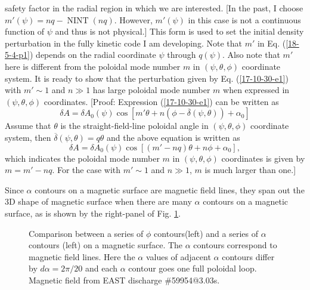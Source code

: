 \documentclass{llncs}
\newcommand{\tmop}[1]{\ensuremath{\operatorname{#1}}}
\begin{document}
safety factor in the radial region in which we are interested. [In the past, I
choose $m' (\psi) = n q - \tmop{NINT} (n q)$. However, $m' (\psi)$ in this
case is not a continuous function of $\psi$ and thus is not physical.] This
form is used to set the initial density perturbation in the fully kinetic code
I am developing. Note that $m'$ in Eq. (\ref{18-5-4-p1}) depends on the radial
coordinate $\psi$ through $q (\psi)$. Also note that $m'$ here is different
from the poloidal mode number $m$ in $(\psi, \theta, \phi)$ coordinate system.
It is ready to show that the perturbation given by Eq. (\ref{17-10-30-e1})
with $m' \sim 1$ and $n \gg 1$ has large poloidal mode number $m$ when
expressed in $(\psi, \theta, \phi)$ coordinates. [Proof: Expression
(\ref{17-10-30-e1}) can be written as
\begin{equation}
  \delta A = \delta A_0 (\psi) \cos [m' \theta + n (\phi - \overline{\delta}
  (\psi, \theta)) + \alpha_0]
\end{equation}
Assume that $\theta$ is the straight-field-line poloidal angle in $(\psi,
\theta, \phi)$ coordinate system, then $\overline{\delta} (\psi, \theta) = q
\theta$ and the above equation is written as
\begin{equation}
  \delta A = \delta A_0 (\psi) \cos [(m' - n q) \theta + n \phi + \alpha_0],
\end{equation}
which indicates the poloidal mode number $m$ in $(\psi, \theta, \phi)$
coordinates is given by $m = m' - n q$. For the case with $m' \sim 1$ and $n
\gg 1$, $m$ is much larger than one.]

Since $\alpha$ contours on a magnetic surface are magnetic field lines, they
span out the 3D shape of magnetic surface when there are many $\alpha$
contours on a magnetic surface, as is shown by the right-panel of Fig.
\ref{17-10-29-e1}.

\begin{figure}[h]
  \caption{\label{17-10-29-e1}Comparison between a series of $\phi$
  contours(left) and a series of $\alpha$ contours (left) on a magnetic
  surface. The $\alpha$ contours correspond to magnetic field lines. Here the
  $\alpha$ values of adjacent $\alpha$ contours differ by $d \alpha = 2 \pi /
  20$ and each $\alpha$ contour goes one full poloidal loop. Magnetic field
  from EAST discharge \#59954@3.03s.}
\end{figure}
\end{document}

